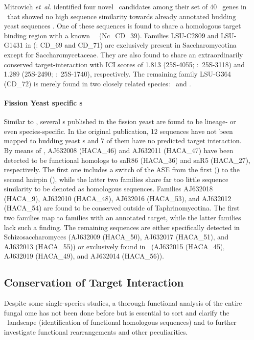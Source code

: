 Mitrovich \emph{et~al.} identified four novel \sno\ candidates among their
set of 40 \sno\ genes in \calb\ that showed no high sequence similarity
towards already annotated budding yeast sequences
\cite{Mitrovich:2010}. One of these sequences is found to share a
homologous target binding region with a known \ncr\ \sno\
(Nc\_CD\_39). Families LSU-C2809 and LSU-G1431 in \cite{Mitrovich:2010}
(\snostrip: CD\_69 and CD\_71) are exclusively present in Saccharomycotina
except for Saccharomycetaceae. They are also found to share an
extraordinarily conserved target-interaction with ICI scores of 1.813
(25S-4055; \calb:~25S-3118) and 1.289 (25S-2490; \calb:~25S-1740),
respectively. The remaining family LSU-G364 (CD\_72) is merely found in two
closely related species: \cdu\ and \ctr.

\paragraph{\textbf{Fission Yeast specific \sno s}}

Similar to \calb, several \sno s published in the fission yeast
\cite{Li:2005} are found to be lineage- or even species-specific. In the
original publication, 12 sequences have not been mapped to budding yeast
\sno s and 7 of them have no predicted target interaction. By means of
\snostrip, AJ632008 (HACA\_46) and AJ632011 (HACA\_47) have been detected
to be functional homologs to snR86 (HACA\_36) and snR5 (HACA\_27),
respectively. The first one includes a switch of the ASE from the first
(\spo) to the second hairpin (\sce), while the latter two families share
far too little sequence similarity to be denoted as homologous
sequences. Families AJ632018 (HACA\_9), AJ632010 (HACA\_48), AJ632016
(HACA\_53), and AJ632012 (HACA\_54) are found to be conserved outside of
Taphrinomycotina. The first two families map to families with an annotated
target, while the latter families lack such a finding. The remaining
sequences are either specifically detected in Schizosaccharomyces (AJ632009
(HACA\_50), AJ632017 (HACA\_51), and AJ632013 (HACA\_55)) or exclusively
found in \spo\ (AJ632015 (HACA\_45), AJ632019 (HACA\_49), and AJ632014
(HACA\_56)).

\subsection{Conservation of Target Interaction}

Despite some single-species studies, a thorough functional analysis of the
entire fungal \sno ome has not been done before but is essential to sort
and clarify the \sno\ landscape (identification of functional homologous
sequences) and to further investigate functional rearrangements and other
peculiarities.


